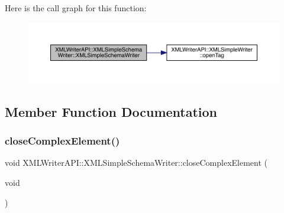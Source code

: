Here is the call graph for this function\+:
\nopagebreak
\begin{figure}[H]
\begin{center}
\leavevmode
\includegraphics[width=350pt]{db/d0b/classXMLWriterAPI_1_1XMLSimpleSchemaWriter_a309425b6927188991ba8fb9d19e0caca_cgraph}
\end{center}
\end{figure}


\subsection{Member Function Documentation}
\mbox{\label{classXMLWriterAPI_1_1XMLSimpleSchemaWriter_a48be6d4cbc08f03e9e76fa94107c4b8a}} 
\subsubsection{\texorpdfstring{closeComplexElement()}{closeComplexElement()}\hspace{0.1cm}{\footnotesize\ttfamily [1/2]}}
{\footnotesize\ttfamily void X\+M\+L\+Writer\+A\+P\+I\+::\+X\+M\+L\+Simple\+Schema\+Writer\+::close\+Complex\+Element (\begin{DoxyParamCaption}\item[{void}]{ }\end{DoxyParamCaption})\hspace{0.3cm}{\ttfamily [inline]}}

